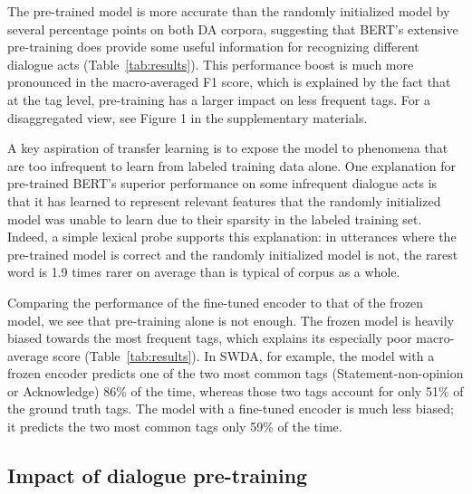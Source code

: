 \documentclass[11pt,a4paper]{article}
\begin{document}
The pre-trained model is more accurate than the randomly initialized model by several percentage points on both DA corpora,
suggesting that BERT's extensive pre-training does provide some useful information for recognizing different dialogue acts (Table~\ref{tab:results}).
This performance boost is much more pronounced in the macro-averaged F1 score,
which is explained by the fact that at the tag level, pre-training has a larger impact on less frequent tags.
For a disaggregated view, see Figure 1 in the supplementary materials.

A key aspiration of transfer learning is to expose the model to phenomena that are too infrequent to learn from labeled training data alone.
One explanation for pre-trained BERT's superior performance on some infrequent dialogue acts is that it has learned to represent relevant features
that the randomly initialized model was unable to learn due to their sparsity in the labeled training set.
Indeed, a simple lexical probe supports this explanation: in utterances where the pre-trained model is correct and the randomly initialized model is not,
the rarest word is 1.9 times rarer on average than is typical of corpus as a whole.

Comparing the performance of the fine-tuned encoder to that of the frozen model, 
we see that pre-training alone is not enough.
The frozen model is heavily biased towards the most frequent tags, which explains its especially poor macro-average score (Table~\ref{tab:results}).
In SWDA, for example, the model with a frozen encoder predicts one of the two most common tags (Statement-non-opinion or Acknowledge) 86\% of the time, whereas those two
tags account for only 51\% of the ground truth tags.
The model with a fine-tuned encoder is much less biased; it predicts the two most common tags only 59\% of the time.




\subsection{Impact of dialogue pre-training} \label{sec:experiment3} %
\end{document}
